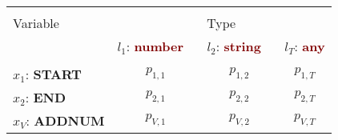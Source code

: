 \renewcommand{\arraystretch}{0.5}
\scriptsize
\begin{tabular}{@{}l@{\hskip 1mm} c@{\hskip 1mm} c@{\hskip 1mm} c@{}}
\toprule\\
Variable & \multicolumn{3}{c}{Type}\\ 
\cmidrule(l){2-4}
& $l_1$: \textbf{\textcolor{Maroon}{number}} \ & $l_2$: \textbf{\textcolor{Maroon}{string}} \ & $l_T$: \textbf{\textcolor{Maroon}{any}}\\ 
\midrule\\
$x_1$: \textbf{\textcolor{mygreen}{START}} & $p_{1,1}$ & $p_{1,2}$ & $p_{1,T}$\\
$x_2$: \textbf{\textcolor{mygreen}{END}} & $p_{2,1}$ & $p_{2,2}$ & $p_{2,T}$\\
$x_V$: \textbf{\textcolor{mygreen}{ADDNUM}} & $p_{V,1}$ & $p_{V,2}$ & $p_{V,T}$\\
\bottomrule
\end{tabular}

